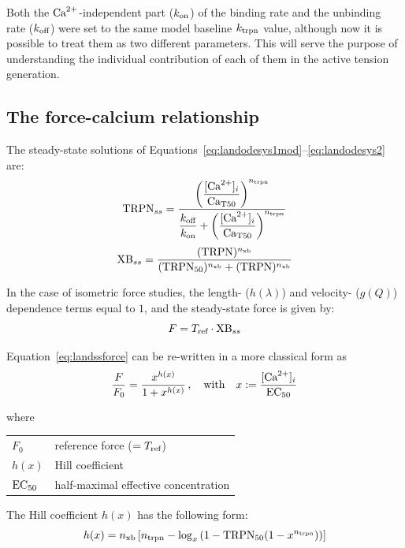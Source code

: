 \vspace{0.2cm}\noindent
Both the $\textrm{Ca}^{2+}$-independent part ($k_{\textrm{on}}$) of the binding rate and the unbinding rate ($k_{\textrm{off}}$) were set to the same model baseline $k_{\textrm{trpn}}$ value, although now it is possible to treat them as two different parameters. This will serve the purpose of understanding the individual contribution of each of them in the active tension generation.


%
%
%
\subsection{The force-calcium relationship}\label{sec:ch2theforcecalciumrelationship}
The steady-state solutions of Equations~\eqref{eq:landodesys1mod}--\eqref{eq:landodesys2} are:
%
\begin{equation}\label{eq:landodesys1_ss}
    \textrm{TRPN}_{ss} = \dfrac{\left(\dfrac{[\textrm{Ca}^{2+}]_{i}}{\textrm{Ca}_{\textrm{T}50}}\right)^{n_{\textrm{trpn}}}}{\dfrac{k_{\textrm{off}}}{k_{\textrm{on}}}+\left(\dfrac{[\textrm{Ca}^{2+}]_{i}}{\textrm{Ca}_{\textrm{T}50}}\right)^{n_{\textrm{trpn}}}}
\end{equation}
%
\begin{equation}\label{eq:landodesys2_ss}
    \textrm{XB}_{ss} = \frac{(\textrm{TRPN})^{n_{\textrm{xb}}}}{(\textrm{TRPN}_{50})^{n_{\textrm{xb}}}+(\textrm{TRPN})^{n_{\textrm{xb}}}}
\end{equation}

\noindent
In the case of isometric force studies, the length- ($h(\lambda)$) and velocity- ($g(Q)$) dependence terms equal to $1$, and the steady-state force is given by:
%
\begin{equation}\label{eq:landssforce}
    F = T_{\textrm{ref}}\cdot \textrm{XB}_{ss}
\end{equation}

\noindent
Equation~\eqref{eq:landssforce} can be re-written in a more classical form as
%
\begin{equation}\label{eq:forcess}
    \frac{F}{F_0} = \frac{x^{h(x)}}{1+x^{h(x)}}\,,\quad\text{with}\quad x:=\frac{[\textrm{Ca}^{2+}]_{i}}{\textrm{EC}_{50}}
\end{equation}

\noindent
where

\vspace{0.2cm}
\begin{tabular}{ll}
    $F_0$  & reference force ($=T_{\textrm{ref}}$) \\
    $h(x)$ & Hill coefficient \\
    $\textrm{EC}_{50}$ & half-maximal effective concentration
\end{tabular}

\vspace{0.2cm}\noindent
The Hill coefficient $h(x)$ has the following form:
%
\begin{equation}
    h(x) = n_{\textrm{xb}}\left[n_{\textrm{trpn}}-\log_{x}{\left(1-\textrm{TRPN}_{50}(1-x^{n_{\textrm{trpn}}})\right)}\right]
\end{equation}

